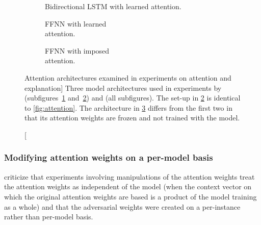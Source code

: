 \begin{figure}[tb]
\centering
\begin{subfigure}{.3\textwidth}
  \centering
  
  \caption{Bidirectional LSTM with learned attention.}
  \label{fig:attn-lstm}
\end{subfigure}\hfill%
\begin{subfigure}{.3\textwidth}
  \centering
  
  \caption{FFNN with learned\\attention.}
  \label{fig:attn-ffnn}
\end{subfigure}\hspace{4mm}%
\begin{subfigure}{.3\textwidth}
  \centering
  
  \caption{FFNN with imposed\\attention.}
  \label{fig:attn-imposed}
\end{subfigure}
\caption
[Attention architectures examined in experiments on attention and explanation]
{Three model architectures used in experiments by \citet{jain2019attentionNotExplanation} (subfigures~\ref{fig:attn-lstm} and~\ref{fig:attn-ffnn}) and \citet{wiegreffe2019attentionNotNot} (all subfigures).
The set-up in \ref{fig:attn-ffnn} is identical to \autoref{fig:attention}.
The architecture in \ref{fig:attn-imposed} differs from the first two in that its attention weights are frozen and not trained with the model.
}
\label{fig:attention-experiments}
\end{figure}


\subsubsection{Modifying attention weights on a per-model basis}

\citet{wiegreffe2019attentionNotNot} criticize that experiments involving manipulations of the attention weights treat the attention weights as independent of the model (when the context vector on which the original attention weights are based is a product of the model training as a whole) and that the adversarial weights were created on a per-instance rather than per-model basis.


